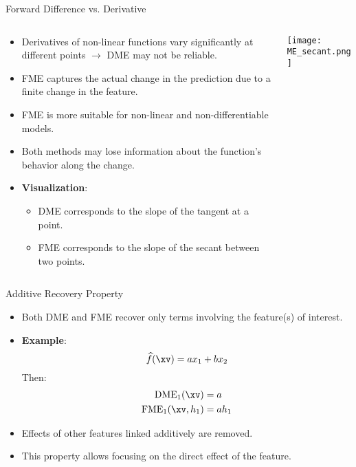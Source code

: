 \documentclass[11pt,compress,t,notes=noshow, aspectratio=169, xcolor=table]{beamer}
\begin{document}
\begin{frame}{Forward Difference vs. Derivative}
\begin{columns}[T]
\begin{column}{0.6\textwidth}
\begin{itemize}
\item Derivatives of non-linear functions vary significantly at different points $\rightarrow$ DME may not be reliable.
\item FME captures the actual change in the prediction due to a finite change in the feature.
\item FME is more suitable for non-linear and non-differentiable models.
\item Both methods may lose information about the function's behavior along the change.
\item \textbf{Visualization}:
\begin{itemize}
\item DME corresponds to the slope of the tangent at a point.
\item FME corresponds to the slope of the secant between two points.
\end{itemize}
\end{itemize}
\end{column}
\begin{column}{0.4\textwidth}
\texttt{[image: ME\_secant.png]}
\end{column}
\end{columns}
\end{frame}

\begin{frame}{Additive Recovery Property}
\begin{itemize}
\item Both DME and FME recover only terms involving the feature(s) of interest.
\item \textbf{Example}:
\[
\widehat{f}(\xv) = a x_1 + b x_2
\]
Then:
\begin{align*}
\text{DME}_1(\xv) &= a \\
\text{FME}_1(\xv, h_1) &= a h_1
\end{align*}
\item Effects of other features linked additively are removed.
\item This property allows focusing on the direct effect of the feature.
\end{itemize}
\end{frame}
\end{document}
